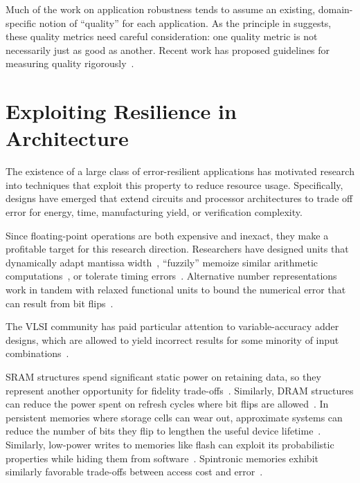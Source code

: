 Much of the work on application robustness tends to assume an existing,
domain-specific notion of ``quality'' for each
application.
As the principle in  suggests, these quality metrics
need careful consideration: one quality metric is not necessarily just as good
as another.
Recent work has proposed guidelines for measuring quality
rigorously~\cite{wddd-quality}.


\section{Exploiting Resilience in Architecture}

The existence of a large class of error-resilient applications has motivated
research into techniques that exploit this property to reduce resource usage.
Specifically, designs have emerged that extend circuits and processor
architectures to trade off error for energy, time, manufacturing yield, or
verification complexity.

Since floating-point operations are both expensive and inexact, they make a
profitable target for this research direction. Researchers have designed units
that dynamically adapt mantissa width~\cite{bitwidthred, hierarchfpu}, ``fuzzily'' memoize
similar arithmetic computations~\cite{fuzzymemo}, or tolerate timing
errors~\cite{kumarhpca, hizli}.
Alternative number
representations work in tandem with relaxed functional units to bound the
numerical error that can result from bit flips~\cite{stanleymarbell}.

The VLSI community has paid particular attention to variable-accuracy adder
designs, which are allowed to yield incorrect results for some minority of
input combinations~\cite{uva-adder, palem-adders, impact, adder-metrics,
configurable-adder, adder-iccad13, adder-tcad, adder-optimal, adder-dac12,
adder-isic09, adder-date08}.

SRAM
structures spend significant static power on retaining data, so they represent
another opportunity for fidelity trade-offs~\cite{hybrid-sram, sramerrors,
partially-forgetful}. Similarly,
DRAM structures can reduce the power spent on refresh cycles where bit flips
are allowed~\cite{flikker, sparkk}.
In persistent memories where storage cells can wear out, approximate systems
can reduce the number of bits they flip to lengthen the useful device
lifetime~\cite{fang-pcm}.
Similarly, low-power writes to memories like flash can exploit its
probabilistic properties while hiding them from software~\cite{halfwits,
powerfade, flash-retention-relax}.
Spintronic memories exhibit similarly favorable trade-offs between access cost
and error~\cite{spintronic-approx}.

